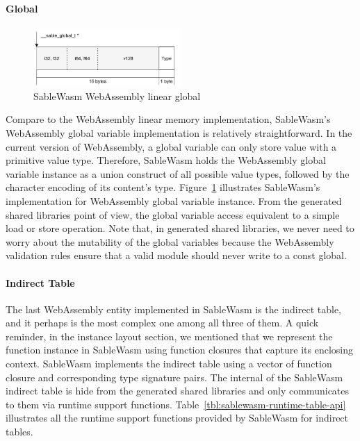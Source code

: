 \paragraph{Global}

\begin{figure}
    \centering
    \includegraphics[width=0.5\textwidth]{Images/5.Backend_and_Runtime/global}
    \caption{SableWasm WebAssembly linear global}
    \label{fig:backend-global}
\end{figure}

Compare to the WebAssembly linear memory implementation, SableWasm's WebAssembly global variable implementation is relatively straightforward. In the current version of WebAssembly, a global variable can only store value with a primitive value type. Therefore, SableWasm holds the WebAssembly global variable instance as a union construct of all possible value types, followed by the character encoding of its content's type. Figure~\ref{fig:backend-global} illustrates SableWasm's implementation for WebAssembly global variable instance. From the generated shared libraries point of view, the global variable access equivalent to a simple load or store operation. Note that, in generated shared libraries, we never need to worry about the mutability of the global variables because the WebAssembly validation rules ensure that a valid module should never write to a const global.


\paragraph{Indirect Table}
The last WebAssembly entity implemented in SableWasm is the indirect table, and it perhaps is the most complex one among all three of them. A quick reminder, in the instance layout section, we mentioned that we represent the function instance in SableWasm using function closures that capture its enclosing context. SableWasm implements the indirect table using a vector of function closure and corresponding type signature pairs. The internal of the SableWasm indirect table is hide from the generated shared libraries and only communicates to them via runtime support functions. Table~\ref{tbl:sablewasm-runtime-table-api} illustrates all the runtime support functions provided by SableWasm for indirect tables.

